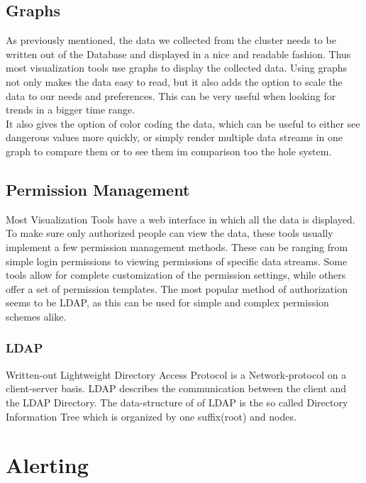 \subsection{Graphs}
As previously mentioned, the data we collected from the cluster needs to be written out of the Database and displayed in a nice and readable fashion. Thus most visualization tools use graphs to display the collected data. 
Using graphs not only makes the data easy to read, but it also adds the option to scale the data to our needs and preferences. This can be very useful when looking for trends in a bigger time range.\\
It also gives the option of color coding the data, which can be useful to either see dangerous values more quickly, or simply render multiple data streams in one graph to compare them or to see them im comparison too the hole system.
\subsection{Permission Management}
Most Visualization Tools have a web interface in which all the data is displayed. To make sure only authorized people can view the data, these tools usually implement a few permission management methods. 
These can be ranging from simple login permissions to viewing permissions of specific data streams. Some tools allow for complete customization of the permission settings, while others offer a set of permission templates. The most popular method of authorization seems to be LDAP, as this can be used for simple and complex permission schemes alike. 
\subsubsection{LDAP}
Written-out Lightweight Directory Access Protocol is a Network-protocol on a client-server basis. LDAP describes the communication between the client and the LDAP Directory. The data-structure of of LDAP is the so called Directory Information Tree which is organized by one suffix(root) and nodes.  
 


\section{Alerting}



\blinddocument
